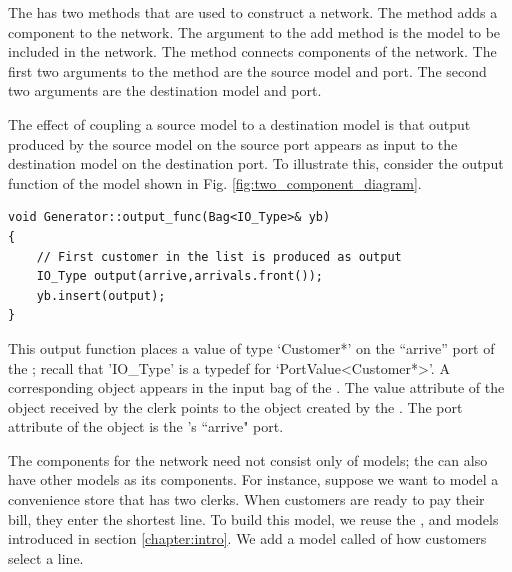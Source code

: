 The  has two methods that are used to construct a network. The  method adds a component to the network. The argument to the add method is the model to be included in the network. The  method connects components of the network. The first two arguments to the  method are the source model and port. The second two arguments are the destination model and port.
 
The effect of coupling a source model to a destination model is that output produced by the source model on the source port appears as input to the destination model on the destination port. To illustrate this, consider the output function of the  model shown in Fig. \ref{fig:two_component_diagram}.
\begin{verbatim}
void Generator::output_func(Bag<IO_Type>& yb)
{
    // First customer in the list is produced as output
    IO_Type output(arrive,arrivals.front());
    yb.insert(output);
}
\end{verbatim}

This output function places a value of type `Customer*' on the ``arrive'' port of the ; recall that 'IO\_Type' is a typedef for `PortValue<Customer*>'. A corresponding  object appears in the input bag of the . The value attribute of the  object received by the clerk points to the  object created by the . The port attribute of the  object is the 's ``arrive" port.

The components for the network need not consist only of  models; the  can also have other  models as its components. For instance, suppose we want to model a convenience store that has two clerks. When customers are ready to pay their bill, they enter the shortest line. To build this model, we reuse the ,  and  models introduced in section \ref{chapter:intro}. We add a model called  of how customers select a line.

